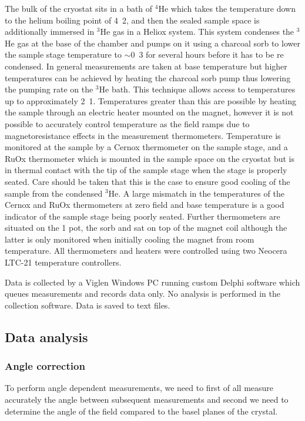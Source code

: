 The bulk of the cryostat sits in a bath of $^4$He which takes the temperature down to the helium boiling point of \unit{4.2}{\kelvin}, and then the sealed sample space is additionally immersed in $^3$He gas in a Heliox system. This system condenses the $^3$He gas at the base of the chamber and pumps on it using a charcoal sorb to lower the sample stage temperature to $\sim$\unit{0.3}{\kelvin} for several hours before it has to be re condensed. In general measurements are taken at base temperature but higher temperatures can be achieved by heating the charcoal sorb pump thus lowering the pumping rate on the $^3$He bath. This technique allows access to temperatures up to approximately \unit{2.1}{\kelvin}. Temperatures greater than this are possible by heating the sample through an electric heater mounted on the magnet, however it is not possible to accurately control temperature as the field ramps due to magnetoresistance effects in the measurement thermometers. Temperature is monitored at the sample by a Cernox thermometer on the sample stage, and a RuOx thermometer which is mounted in the sample space on the cryostat but is in thermal contact with the tip of the sample stage when the stage is properly seated. Care should be taken that this is the case to ensure good cooling of the sample from the condensed $^3$He. A large mismatch in the temperatures of the Cernox and RuOx thermometers at zero field and base temperature is a good indicator of the sample stage being poorly seated. Further thermometers are situated on the \unit{1}{\kelvin} pot, the sorb and sat on top of the magnet coil although the latter is only monitored when initially cooling the magnet from room temperature. All thermometers and heaters were controlled using two Neocera LTC-21 temperature controllers.

Data is collected by a Viglen Windows PC running custom Delphi software which queues measurements and records data only. No analysis is performed in the collection software. Data is saved to text files.

\subsection{Data analysis}

\subsubsection{Angle correction}
    \label{Sec:Exp:AngleCorrection}

To perform angle dependent measurements, we need to first of all measure accurately the angle between subsequent measurements and second we need to determine the angle of the field compared to the basel planes of the crystal. 

